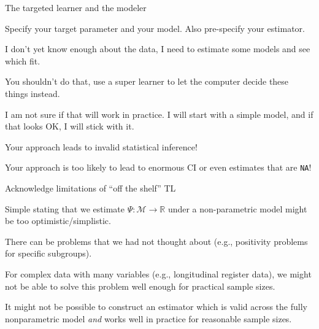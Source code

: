 \documentclass[smaller]{beamer}\usepackage{listings}
\newcommand{\R}{\mathbb{R}}
\newcommand{\1}{\mathds{1}}
\begin{document}
\begin{frame}[label={sec:orgb277aa5}]{The targeted learner and the modeler}
\begin{minipage}[t]{.8\linewidth}
  Specify your target parameter and your model. Also pre-specify your estimator.
\end{minipage}
\vfill
\begin{flushright}
  \begin{minipage}[t]{.8\linewidth}
    I don't yet know enough about the data, I need to estimate some models and
    see which fit.
  \end{minipage}
\end{flushright}
\vfill
\begin{minipage}[t]{0.8\linewidth}
  You shouldn't do that, use a super learner to let the computer decide these
  things instead.
\end{minipage}
\vfill
\begin{flushright}
  \begin{minipage}[t]{.8\linewidth}
    I am not sure if that will work in practice. I will start with a simple
    model, and if that looks OK, I will stick with it.
  \end{minipage}
\end{flushright}
\vfill
\begin{minipage}[t]{0.8\linewidth}
  Your approach leads to invalid statistical inference!
\end{minipage}
\vfill
\begin{flushright}
  \begin{minipage}[t]{.8\linewidth}
    Your approach is too likely to lead to enormous CI or even estimates that
    are \texttt{NA}!
  \end{minipage}
\end{flushright}
\end{frame}

\begin{frame}[label={sec:org3881282}]{Acknowledge limitations of ``off the shelf'' TL}

Simple stating that we estimate $\Psi \colon \mathcal{M} \rightarrow \R$ under
a non-parametric model might be too optimistic/simplistic.

\vfill

There can be problems that we had not thought about (e.g., positivity problems
for specific subgroups).

\vfill

For complex data with many variables (e.g., longitudinal register data), we
might not be able to solve this problem well enough for practical sample sizes.

\vfill

It might not be possible to construct an estimator which is valid across the
fully nonparametric model \emph{and} works well in practice for reasonable sample
sizes.
\end{frame}
\end{document}
